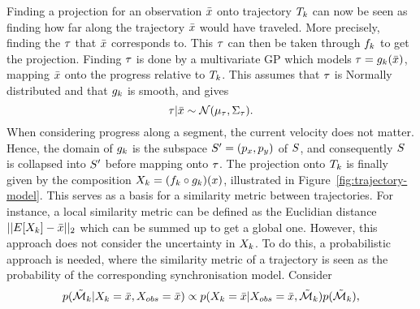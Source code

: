Finding a projection for an observation $\bar{x}$ onto trajectory
$T_{k}$ can now be seen as finding how far along the trajectory $\bar{x}$
would have traveled. More precisely, finding the $\tau$ that $\bar{x}$
corresponds to. This $\tau$ can then be taken through $f_{k}$
to get the projection. Finding $\tau$ is done by a multivariate
GP which models $\tau = g_{k}(\bar{x})$, mapping $\bar{x}$ onto the
progress relative to $T_{k}$. This assumes that $\tau$ is Normally
distributed and that $g_{k}$ is smooth, and gives
\begin{equation}
  \label{eq:g-posterior}
  \tau \vert \bar{x} \sim \mathcal{N}(\mu_{\tau}, \Sigma_{\tau}).
\end{equation}
When considering progress along a segment, the current velocity does not matter. 
Hence, the domain of $g_{k}$ is the subspace 
$S' = (p_x, p_y)$ of $S$, and
consequently $S$ is collapsed into $S'$ before
mapping onto $\tau$. 
The projection onto $T_{k}$ is finally given by the composition $X_{k} = (f_{k} \circ
g_{k})(x)$, illustrated in Figure~\ref{fig:trajectory-model}.
This serves as a basis for a similarity metric between trajectories.
For instance, a local similarity metric can be defined as the Euclidian
distance $||E[X_{k}] - \bar{x}||_{2}$ which can be summed up
to get a global one. However, this approach does not consider the uncertainty in
$X_{k}$. To do this, a probabilistic approach is needed, where the
similarity metric of a trajectory is seen as the probability of the corresponding
synchronisation model. Consider
\begin{equation}
  \label{eq:model-posterior-probability}
  p(\tilde{\mathcal{M}}_{k} \vert X_{k} = \bar{x}, X_{obs} = \bar{x}) \propto
  p(X_{k} = \bar{x} \vert X_{obs} = \bar{x}, \tilde{\mathcal{M}}_{k})
  p(\tilde{\mathcal{M}}_{k}),
\end{equation}
